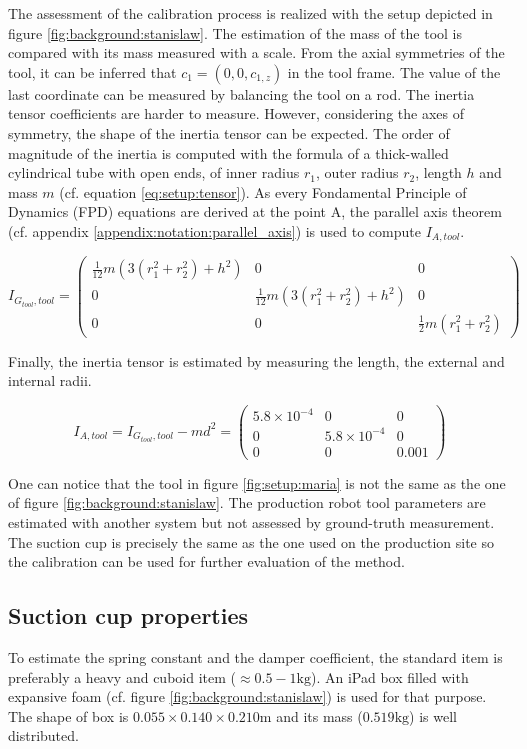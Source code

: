 \documentclass[/home/francois/latex/report/main.tex]{subfiles}
\begin{document}
The assessment of the calibration process is realized with the setup depicted in figure \ref{fig:background:stanislaw}. The estimation of the mass of the tool is compared with its mass measured with a scale. From the axial symmetries of the tool, it can be inferred that $c_1 = (0, 0, c_{1,z})$ in the tool frame. The value of the last coordinate can be measured by balancing the tool on a rod. The inertia tensor coefficients are harder to measure. However, considering the axes of symmetry, the shape of the inertia tensor can be expected. The order of magnitude of the inertia is computed with the formula of a thick-walled cylindrical tube with open ends, of inner radius $r_1$, outer radius $r_2$, length $h$ and mass $m$ (cf. equation \ref{eq:setup:tensor}). As every Fondamental Principle of Dynamics (FPD) equations are derived at the point A, the parallel axis theorem (cf. appendix \ref{appendix:notation:parallel_axis}) is used to compute $I_{A, tool}$.

\begin{equation}
  \label{eq:setup:tensor}
  I_{G_{tool}, tool} =
  \begin{pmatrix}
  \frac{1}{12} m(3(r_1^2+r_2^2) + h^2) & 0 & 0  \\
  0 & \frac{1}{12} m(3(r_1^2+r_2^2) + h^2) & 0 \\
  0 & 0 & \frac{1}{2} m(r_1^2+r_2^2)
  \end{pmatrix}
\end{equation}

Finally, the inertia tensor is estimated by measuring the length, the external and internal radii.

\begin{equation*}
  I_{A, tool} = I_{G_{tool}, tool} - m d^2 =
  \begin{pmatrix}
  5.8 \times 10^{-4} & 0 & 0  \\
  0 & 5.8 \times 10^{-4} & 0 \\
  0 & 0 & 0.001
  \end{pmatrix}
\end{equation*}

One can notice that the tool in figure \ref{fig:setup:maria} is not the same as the one of figure \ref{fig:background:stanislaw}. The production robot tool parameters are estimated with another system but not assessed by ground-truth measurement. The suction cup is precisely the same as the one used on the production site so the calibration can be used for further evaluation of the method.

\subsection{Suction cup properties}

To estimate the spring constant and the damper coefficient, the standard item is preferably a heavy and cuboid item ($\approx 0.5-1 \si{\kilogram}$). An iPad box filled with expansive foam (cf. figure \ref{fig:background:stanislaw}) is used for that purpose. The shape of box is $0.055 \times 0.140 \times 0.210 \si{\meter}$ and its mass ($0.519 \si{\kilogram}$) is well distributed.
\end{document}
